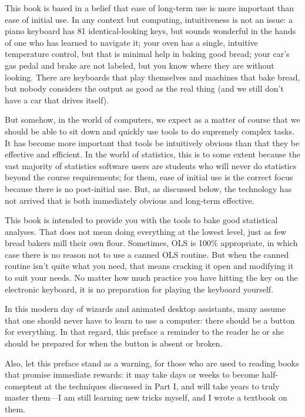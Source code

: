 
This book is based in a belief that ease of long-term use is more
important than ease of initial use. In any context but computing,
intuitiveness is not an issue: a piano keyboard has 81 identical-looking
keys, but sounds wonderful in the hands of one who has learned to
navigate it; your oven has a single, intuitive temperature control,
but that is minimal help in baking good bread; your car's gas pedal and
brake are not labeled, but you know where they are without looking. There
are keyboards that play themselves and machines that bake bread, but
nobody considers the output as good as the real thing (and we still
don't have a car that drives itself).

But somehow, in the world of computers, we expect as a matter of course
that we should be able to sit down and quickly use tools to do supremely
complex tasks. It has become more important that tools be intuitively
obvious than that they be effective and efficient. In the world of
statistics, this is to some extent because the vast majority of
statistics software users are students who will never do statistics
beyond the course requirements; for them, ease of initial use is the
correct focus because there is no post-initial use. But, as discussed
below, the technology has not arrived that is both immediately obvious
and long-term effective. 

This book is intended to provide you with the tools to bake good
statistical analyses. That does not mean doing everything at the lowest
level, just as few bread bakers mill their own flour. Sometimes, OLS is
100\% appropriate, in which case there is no reason not to use a canned
OLS routine. But when the canned routine isn't quite what you need, that
means cracking it open and modifying it to suit your needs.  No matter
how much practice you have hitting the 
key on the electronic keyboard, it is no preparation for playing the
keyboard yourself.

In this
modern day of wizards and animated desktop assistants, many assume 
that one should never have to learn to use a computer: there should be
a button for everything. In that regard, this preface a reminder to the
reader he or she should be prepared for when the button is absent
or broken. 

Also, let this preface stand as a warning, for those who are used to 
reading books that promise immediate rewards: it may take days or weeks
to become half-comeptent at the techniques discussed in Part I, and will
take years to truly master them---I am still learning new tricks myself,
and I wrote a textbook on them.  

